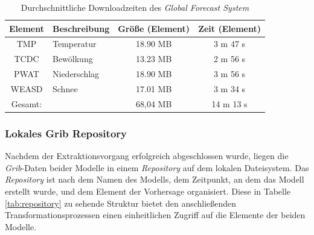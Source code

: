 \begin{table}[h]
  \centering
  {\sf
    \footnotesize
    \begin{longtable}{@{}clcc}
      \toprule
      \textbf{Element} & \textbf{Beschreibung} & \textbf{Größe (Element)} & \textbf{Zeit (Element)} \\
      \midrule
      TMP   & Temperatur & 18.90 MB &  3 m 47 s \\
      TCDC  & Bewölkung & 13.23 MB &  2 m 56 s \\
      PWAT  & Niederschlag & 18.90 MB &  3 m 56 s \\
      WEASD & Schnee & 17.01 MB &  3 m 34 s \\
      \midrule
      Gesamt: & & 68,04 MB &  14 m 13 s \\
      \bottomrule
    \end{longtable}
  }
  \caption{Durchschnittliche Downloadzeiten des \textit{Global Forecast System}}
  \label{tab:download_messung_gfs}
\end{table}

\subsubsection{Lokales Grib Repository}
Nachdem der Extraktionsvorgang erfolgreich abgeschlossen wurde, liegen
die \textit{Grib}-Daten beider Modelle in einem \textit{Repository}
auf dem lokalen Dateisystem. Das \textit{Repository} ist nach dem
Namen des Modells, dem Zeitpunkt, an dem das Modell erstellt wurde,
und dem Element der Vorhersage organisiert. Diese in Tabelle
\ref{tab:repository} zu sehende Struktur bietet den anschließenden
Transformationsprozessen einen einheitlichen Zugriff auf die Elemente
der beiden Modelle.

